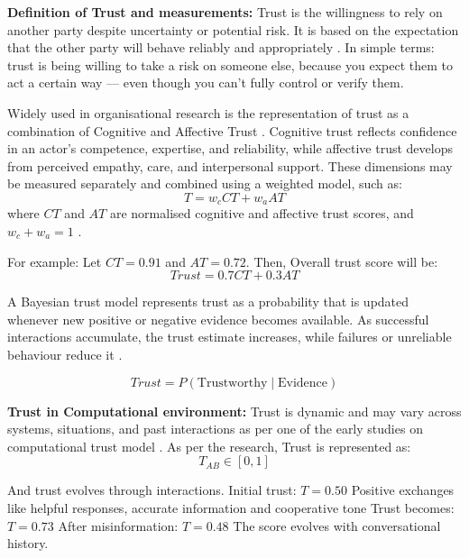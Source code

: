 \documentclass[conference]{IEEEtran}
\begin{document}
\textbf{Definition of Trust and measurements:}
Trust is the willingness to rely on another party despite uncertainty or potential risk. It is based on the expectation that the other party will behave reliably and appropriately \cite{ref24}. In simple terms: trust is being willing to take a risk on someone else, because you expect them to act a certain way — even though you can’t fully control or verify them. 

Widely used in organisational research is the representation of trust as a combination of Cognitive and Affective Trust \cite{ref25}. Cognitive trust reflects confidence in an actor’s competence, expertise, and reliability, while affective trust develops from perceived empathy, care, and interpersonal support. These dimensions may be measured separately and combined using a weighted model, such as:
\begin{equation}
T = w_c CT + w_a AT
\end{equation}
where $CT$ and $AT$ are normalised cognitive and affective trust scores, and $w_c + w_a = 1$ \cite{ref1}.

For example: Let $CT=0.91$ and $AT=0.72$. Then, Overall trust score will be:
\begin{equation}
Trust = 0.7 CT + 0.3 AT
\end{equation}

A Bayesian trust model represents trust as a probability that is updated whenever new positive or negative evidence becomes available. As successful interactions accumulate, the trust estimate increases, while failures or unreliable behaviour reduce it \cite{ref26}.

\begin{equation}
Trust = P(\text{Trustworthy} \mid \text{Evidence})
\end{equation}

\textbf{Trust in Computational environment:}
Trust is dynamic and may vary across systems, situations, and past interactions as per one of the early studies on computational trust model \cite{ref27}. As per the research, Trust is represented as:
\begin{equation}
T_{AB} \in [0, 1]
\end{equation}

And trust evolves through interactions. Initial trust:
$T=0.50$
Positive exchanges like helpful responses, accurate information and cooperative tone
Trust becomes:
$T=0.73$
After misinformation:
$T=0.48$
The score evolves with conversational history.
\end{document}

